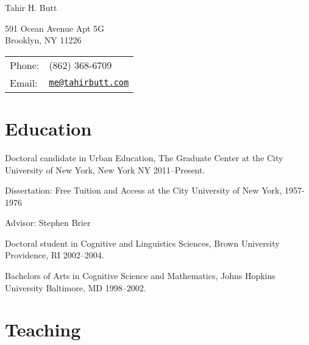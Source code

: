 \documentclass[letterpaper]{article}
\def\name{Tahir H. Butt}
\renewenvironment{itemize}{
  \begin{list}{}{
    \setlength{\leftmargin}{1.5em}
  }
}{
  \end{list}
}
\begin{document}
{\huge \name}


\vspace{0.25in}

\begin{minipage}{0.45\linewidth}
  591 Ocean Avenue Apt 5G \\
  Brooklyn, NY 11226
  \end{minipage}
\begin{minipage}{0.45\linewidth}
  \begin{tabular}{ll}
    Phone: & (862) 368-6709 \\
    Email: & \href{mailto:me@tahirbutt.com}{\tt me@tahirbutt.com} \\
  \end{tabular}
\end{minipage}


\section*{Education}

\begin{itemize}
    \item Doctoral candidate in Urban Education, The Graduate Center at the City University of New York, New York NY 2011--Present.
    \begin{itemize}
        \item Dissertation: Free Tuition and Access at the City University of New York, 1957-1976
        \item Advisor: Stephen Brier
    \end{itemize}
    \item Doctoral student in Cognitive and Linguistics Sciences, Brown University Providence, RI 2002--2004.
    \item Bachelors of Arts in Cognitive Science and Mathematics, Johns Hopkins University Baltimore, MD 1998--2002.
\end{itemize}

\section*{Teaching}
\end{document}
